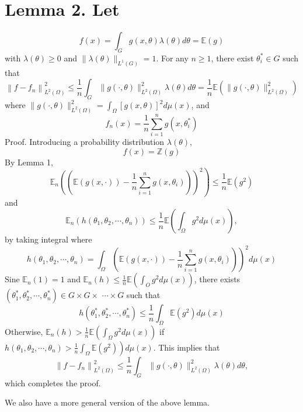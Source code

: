 \documentclass[10pt]{article}
\begin{document}
\section{Lemma 2. Let}
$$
f(x)=\int_{G} g(x, \theta) \lambda(\theta) d \theta=\mathbb{E}(g)
$$
with $\lambda(\theta) \geq 0$ and $\|\lambda(\theta)\|_{L^{1}(G)}=1$. For any $n \geq 1$, there exist $\theta_{i}^{*} \in G$ such that
$$
\left\|f-f_{n}\right\|_{L^{2}(\Omega)}^{2} \leq \frac{1}{n} \int_{G}\|g(\cdot, \theta)\|_{L^{2}(\Omega)}^{2} \lambda(\theta) d \theta=\frac{1}{n} \mathbb{E}\left(\|g(\cdot, \theta)\|_{L^{2}(\Omega)}^{2}\right)
$$
where $\|g(\cdot, \theta)\|_{L^{2}(\Omega)}^{2}=\int_{\Omega}[g(x, \theta)]^{2} d \mu(x)$, and
$$
f_{n}(x)=\frac{1}{n} \sum_{i=1}^{n} g\left(x, \theta_{i}^{*}\right)
$$
Proof. Introducing a probability distribution $\lambda(\theta)$,
$$
f(x)=\mathbb{Z}(g)
$$
By Lemma 1,
$$
\left.\mathbb{E}_{n}\left(\left(\mathbb{E}(g(x, \cdot))-\frac{1}{n} \sum_{i=1}^{n} g\left(x, \theta_{i}\right)\right)\right)^{2}\right) \leq \frac{1}{n} \mathbb{E}\left(g^{2}\right)
$$
and
$$
\mathbb{E}_{n}\left(h\left(\theta_{1}, \theta_{2}, \cdots, \theta_{n}\right)\right) \leq \frac{1}{n} \mathbb{E}\left(\int_{\Omega} g^{2} d \mu(x)\right),
$$
by taking integral where
$$
\left.h\left(\theta_{1}, \theta_{2}, \cdots, \theta_{n}\right)=\int_{\Omega}\left(\mathbb{E}(g(x, \cdot))-\frac{1}{n} \sum_{i=1}^{n} g\left(x, \theta_{i}\right)\right)\right)^{2} d \mu(x)
$$
Sine $\mathbb{E}_{n}(1)=1$ and $\mathbb{E}_{n}(h) \leq \frac{1}{n} \mathbb{E}\left(\int_{O} g^{2} d \mu(x)\right)$, there exists $\left(\theta_{1}^{*}, \theta_{2}^{*}, \cdots, \theta_{n}^{*}\right) \in G \times G \times$ $\cdots \times G$ such that
$$
h\left(\theta_{1}^{*}, \theta_{2}^{*}, \cdots, \theta_{n}^{*}\right) \leq \frac{1}{n} \int_{\Omega} \mathbb{E}\left(g^{2}\right) d \mu(x)
$$
Otherwise, $\mathbb{E}_{n}(h)>\frac{1}{n} \mathbb{E}\left(\int_{\Omega} g^{2} d \mu(x)\right)$ if $\left.h\left(\theta_{1}, \theta_{2}, \cdots, \theta_{n}\right)>\frac{1}{n} \int_{\Omega} \mathbb{E}\left(g^{2}\right)\right) d \mu(x) .$ This implies that
$$
\left\|f-f_{n}\right\|_{L^{2}(\Omega)}^{2} \leq \frac{1}{n} \int_{G}\|g(\cdot, \theta)\|_{L^{2}(\Omega)}^{2} \lambda(\theta) d \theta,
$$
which completes the proof.

We also have a more general version of the above lemma.
\end{document}
